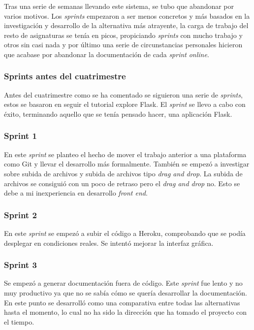 Tras una serie de semanas llevando este sistema, se tubo que abandonar por varios motivos. Los \emph{sprints} empezaron a ser menos concretos y más basados en la investigación y desarrollo de la alternativa más atrayente, la carga de trabajo del resto de asignaturas se tenía en picos, propiciando \emph{sprints} con mucho trabajo y otros sin casi nada y por último una serie de circunstancias personales hicieron que acabase por abandonar la documentación de cada \emph{sprint} \emph{online}.

\subsubsection{Sprints antes del cuatrimestre}
Antes del cuatrimestre como se ha comentado se siguieron una serie de \emph{sprints}, estos se basaron en seguir el tutorial explore Flask. El \emph{sprint} se llevo a cabo con éxito, terminando aquello que se tenía pensado hacer, una aplicación Flask.

\subsubsection{Sprint 1}
En este \emph{sprint} se planteo el hecho de mover el trabajo anterior a una plataforma como Git y llevar el desarrollo más formalmente. También se empezó a investigar sobre subida de archivos y subida de archivos tipo \emph{drag and drop}. La subida de archivos se consiguió con un poco de retraso pero el \emph{drag and drop} no. Esto se debe a mi inexperiencia en desarrollo \emph{front end}.


\subsubsection{Sprint 2}
En este \emph{sprint} se empezó a subir el código a Heroku, comprobando que se podía desplegar en condiciones reales. Se intentó mejorar la interfaz gráfica.

\subsubsection{Sprint 3}
Se empezó a generar documentación fuera de código. Este \emph{sprint} fue lento y no muy productivo ya que no se sabía cómo se quería desarrollar la documentación. En este punto se desarrolló como una comparativa entre todas las alternativas hasta el momento, lo cual no ha sido la dirección que ha tomado el proyecto con el tiempo.

